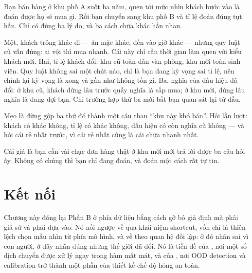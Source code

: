 \documentclass[../../deep_learning.tex]{subfiles}
\begin{document}
\begin{dongian}
Bạn bán hàng ở khu phố A suốt ba năm, quen tới mức nhìn khách bước vào là đoán được họ sẽ mua gì. Rồi bạn chuyển sang khu phố B và tỉ lệ đoán đúng tụt hẳn. Chỉ có đúng ba lý do, và ba cách chữa khác hẳn nhau.

Một, khách trông khác đi --- ăn mặc khác, đến vào giờ khác --- nhưng quy luật cũ vẫn đúng: ai vội thì mua nhanh. Cái này chỉ cần thời gian làm quen với kiểu khách mới. Hai, tỉ lệ khách đổi: khu cũ toàn dân văn phòng, khu mới toàn sinh viên. Quy luật không sai một chút nào, chỉ là bạn đang kỳ vọng sai tỉ lệ, nên chỉnh lại kỳ vọng là xong và gần như không tốn gì. Ba, nghĩa của dấu hiệu đã đổi: ở khu cũ, khách đứng lâu trước quầy nghĩa là sắp mua; ở khu mới, đứng lâu nghĩa là đang đợi bạn. Chỉ trường hợp thứ ba mới bắt bạn quan sát lại từ đầu.

Mẹo là đừng gộp ba thứ đó thành một câu than ``khu này khó bán''. Hỏi lần lượt: khách có khác không, tỉ lệ có khác không, dấu hiệu có còn nghĩa cũ không --- và hỏi cái rẻ nhất trước, vì cái rẻ nhất cũng là cái chữa nhanh nhất.

Cái giá là bạn cần vài chục đơn hàng thật ở khu mới mới trả lời được ba câu hỏi ấy. Không có chúng thì bạn chỉ đang đoán, và đoán một cách rất tự tin.

\end{dongian}

\section{Kết nối}
Chương này đóng lại Phần B ở phía dữ liệu bằng cách gỡ bỏ giả định mà  phải giả sử và  phải dựa vào. Nó nối ngược về  qua khái niệm shortcut, vốn chỉ là thiên lệch chọn mẫu nhìn từ phía mô hình, và về  theo quan hệ đối lập: ở đó nhãn sai vì con người, ở đây nhãn đúng nhưng thế giới đã đổi. Nó là tiền đề của , nơi một số dịch chuyển được xử lý ngay trong hàm mất mát, và của , nơi OOD detection và calibration trở thành một phần của thiết kế chế độ hỏng an toàn.
\end{document}

